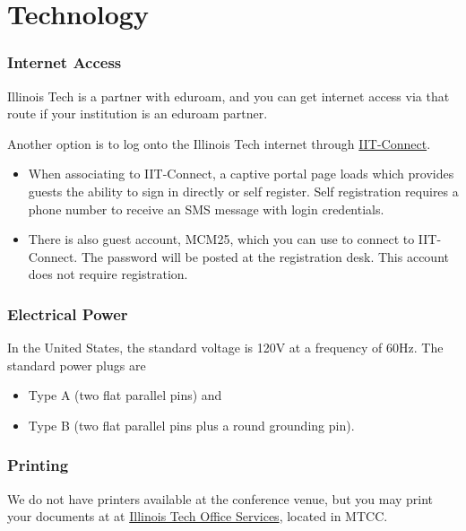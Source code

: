 \documentclass[12pt,lettersize,oneside]{book} %
\begin{document}
\section{Technology}


\subsubsection{Internet Access}


Illinois Tech is a partner with eduroam, and you can get internet access via that route if your institution is an eduroam partner.

Another option is to log onto the Illinois Tech internet through \href{https://www.iit.edu/ots/internet-network/illinois-tech-wireless-networks/guest-wireless}{IIT-Connect}.

\begin{itemize}
	\item When associating to IIT-Connect, a captive portal page loads which provides guests the ability to sign in directly or self register. Self registration requires a phone number to receive an SMS message with login credentials.

	\item There is also guest account, MCM25, which you can use to connect to IIT-Connect.  The password will be posted at the registration desk.  This account does not require registration.
\end{itemize}

\subsubsection{Electrical Power}

In the United States, the standard voltage is 120V at a frequency of 60Hz.  The standard power plugs are
\begin{itemize}
	\item Type A (two flat parallel pins) and
	\item Type B (two flat parallel pins plus a round grounding pin).
\end{itemize}

\subsubsection{Printing}

We do not have printers available at the conference venue, but you may print your documents at
at \href{https://iitofficeservices.myprintdesk.net}{Illinois Tech Office Services}, located in MTCC.
\end{document}
